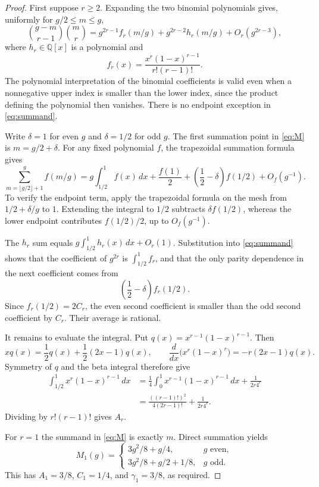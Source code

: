 \documentclass[11pt]{article}
\theoremstyle{remark}\newtheorem{remark}[theorem]{Remark}
\newcommand{\Q}{\mathbb Q}
\begin{document}
\begin{proof}
First suppose $r\ge2$. Expanding the two binomial polynomials gives, uniformly for $g/2\le m\le g$,
\begin{equation}\label{eq:summand}
 \binom{g-m}{r-1}\binom{m}{r}
 =g^{2r-1}f_r(m/g)+g^{2r-2}h_r(m/g)+O_r(g^{2r-3}),
\end{equation}
where $h_r\in\Q[x]$ is a polynomial and
\[
 f_r(x)=\frac{x^r(1-x)^{r-1}}{r!(r-1)!}.
\]
The polynomial interpretation of the binomial coefficients is valid even when a nonnegative upper index is smaller than the lower index, since the product defining the polynomial then vanishes. There is no endpoint exception in \eqref{eq:summand}.

Write $\delta=1$ for even $g$ and $\delta=1/2$ for odd $g$. The first summation point in \eqref{eq:M} is $m=g/2+\delta$. For any fixed polynomial $f$, the trapezoidal summation formula gives
\begin{equation}\label{eq:EM}
 \sum_{m=\lfloor g/2\rfloor+1}^{g}f(m/g)
 =g\int_{1/2}^1f(x)\,dx+\frac{f(1)}2
       +\left(\frac12-\delta\right)f(1/2)+O_f(g^{-1}).
\end{equation}
To verify the endpoint term, apply the trapezoidal formula on the mesh from $1/2+\delta/g$ to $1$. Extending the integral to $1/2$ subtracts $\delta f(1/2)$, whereas the lower endpoint contributes $f(1/2)/2$, up to $O_f(g^{-1})$.

The $h_r$ sum equals $g\int_{1/2}^1 h_r(x)\,dx+O_r(1)$. Substitution into \eqref{eq:summand} shows that the coefficient of $g^{2r}$ is $\int_{1/2}^1 f_r$, and that the only parity dependence in the next coefficient comes from
\[
 \left(\frac12-\delta\right)f_r(1/2).
\]
Since $f_r(1/2)=2C_r$, the even second coefficient is smaller than the odd second coefficient by $C_r$. Their average is rational.

It remains to evaluate the integral. Put $q(x)=x^{r-1}(1-x)^{r-1}$. Then
\[
 xq(x)=\frac12q(x)+\frac12(2x-1)q(x),
 \qquad
 \frac{d}{dx}\bigl(x^r(1-x)^r\bigr)=-r(2x-1)q(x).
\]
Symmetry of $q$ and the beta integral therefore give
\begin{align*}
 \int_{1/2}^1x^r(1-x)^{r-1}\,dx
 &=\frac14\int_0^1x^{r-1}(1-x)^{r-1}\,dx+\frac{1}{2r4^r}\\
 &=\frac{((r-1)!)^2}{4(2r-1)!}+\frac{1}{2r4^r}.
\end{align*}
Dividing by $r!(r-1)!$ gives $A_r$.

For $r=1$ the summand in \eqref{eq:M} is exactly $m$. Direct summation yields
\[
 M_1(g)=\begin{cases}
 3g^2/8+g/4,&g\text{ even},\\
 3g^2/8+g/2+1/8,&g\text{ odd}.
 \end{cases}
\]
This has $A_1=3/8$, $C_1=1/4$, and $\gamma_1=3/8$, as required.
\end{proof}
\end{document}
